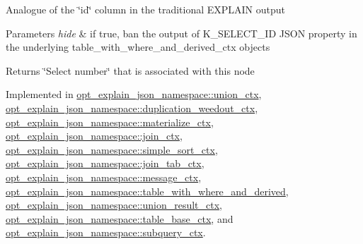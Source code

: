 Analogue of the \char`\"{}id\char`\"{} column in the traditional E\+X\+P\+L\+A\+IN output


\begin{DoxyParams}{Parameters}
{\em hide} & if true, ban the output of K\+\_\+\+S\+E\+L\+E\+C\+T\+\_\+\+ID J\+S\+ON property in the underlying table\+\_\+with\+\_\+where\+\_\+and\+\_\+derived\+\_\+ctx objects\\
\hline
\end{DoxyParams}
\begin{DoxyReturn}{Returns}
\char`\"{}\+Select number\char`\"{} that is associated with this node 
\end{DoxyReturn}


Implemented in \mbox{\hyperlink{classopt__explain__json__namespace_1_1union__ctx_a12834a26065cdae8c5b5c39d91ecdcec}{opt\+\_\+explain\+\_\+json\+\_\+namespace\+::union\+\_\+ctx}}, \mbox{\hyperlink{classopt__explain__json__namespace_1_1duplication__weedout__ctx_ac1df854f614e849880a6449f5c92a98b}{opt\+\_\+explain\+\_\+json\+\_\+namespace\+::duplication\+\_\+weedout\+\_\+ctx}}, \mbox{\hyperlink{classopt__explain__json__namespace_1_1materialize__ctx_ae1e9e31aa9072cf01733c417a1821773}{opt\+\_\+explain\+\_\+json\+\_\+namespace\+::materialize\+\_\+ctx}}, \mbox{\hyperlink{classopt__explain__json__namespace_1_1join__ctx_ab5a53a0661e15a3cfca73c0209038945}{opt\+\_\+explain\+\_\+json\+\_\+namespace\+::join\+\_\+ctx}}, \mbox{\hyperlink{classopt__explain__json__namespace_1_1simple__sort__ctx_aa375936b99b0a0bfa29fdd30f1eb860c}{opt\+\_\+explain\+\_\+json\+\_\+namespace\+::simple\+\_\+sort\+\_\+ctx}}, \mbox{\hyperlink{classopt__explain__json__namespace_1_1join__tab__ctx_a294e12d9416adb645ab30841bddda4e0}{opt\+\_\+explain\+\_\+json\+\_\+namespace\+::join\+\_\+tab\+\_\+ctx}}, \mbox{\hyperlink{classopt__explain__json__namespace_1_1message__ctx_a76f2d4b59c3707aa67afef272d4a00ca}{opt\+\_\+explain\+\_\+json\+\_\+namespace\+::message\+\_\+ctx}}, \mbox{\hyperlink{classopt__explain__json__namespace_1_1table__with__where__and__derived_ab71bf926210b34494e172ff100cc348b}{opt\+\_\+explain\+\_\+json\+\_\+namespace\+::table\+\_\+with\+\_\+where\+\_\+and\+\_\+derived}}, \mbox{\hyperlink{classopt__explain__json__namespace_1_1union__result__ctx_af03161b8ce22f7a3e95489dd1be62118}{opt\+\_\+explain\+\_\+json\+\_\+namespace\+::union\+\_\+result\+\_\+ctx}}, \mbox{\hyperlink{classopt__explain__json__namespace_1_1table__base__ctx_afc1c98638ff3c4cc5b33ef99164cb144}{opt\+\_\+explain\+\_\+json\+\_\+namespace\+::table\+\_\+base\+\_\+ctx}}, and \mbox{\hyperlink{classopt__explain__json__namespace_1_1subquery__ctx_abfd5e54f4399b5b4269573895c84a0dc}{opt\+\_\+explain\+\_\+json\+\_\+namespace\+::subquery\+\_\+ctx}}.

